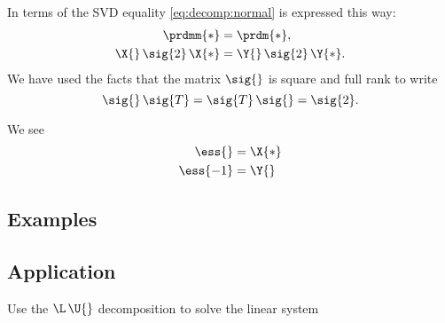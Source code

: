 In terms of the SVD equality \eqref{eq:decomp:normal} is expressed this way:
\begin{equation}
  \begin{split}
     \prdmm{*} &= \prdm{*},\\
     \X{}\, \sig{2}\, \X{*} &= \Y{}\, \sig{2}\, \Y{*}.
  \end{split}
\end{equation}
We have used the facts that the matrix $\sig{}$ is square and full rank to write
\begin{equation}
  \sig{}\,\sig{T} = \sig{T}\,\sig{} = \sig{2}.
\end{equation}

We see
\begin{equation}
  \begin{split}
    \ess{} &= \X{*}\\
    \ess{-1} &= \Y{}
  \end{split}
\end{equation}


\subsection{Examples}


\subsection{Application}
Use the $\L\,\U{}$ decomposition to solve the linear system

\endinput